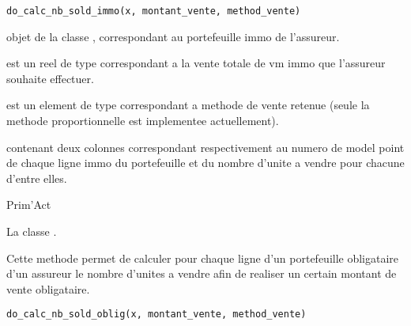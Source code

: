 \documentclass[a4paper]{book}
\begin{document}
%
\begin{Usage}
\begin{verbatim}
do_calc_nb_sold_immo(x, montant_vente, method_vente)
\end{verbatim}
\end{Usage}
%
\begin{Arguments}
\begin{ldescription}
\item[\code{x}] objet de la classe , correspondant au portefeuille immo de l'assureur.

\item[\code{montant\_vente}] est un reel de type  correspondant a la vente totale de vm immo
que l'assureur souhaite effectuer.

\item[\code{method\_vente}] est un element de type  correspondant a methode de vente retenue
(seule la methode proportionnelle est implementee actuellement).
\end{ldescription}
\end{Arguments}
%
\begin{Value}
 contenant deux colonnes  correspondant respectivement
au numero de model point de chaque ligne immo du portefeuille et du nombre d'unite a vendre pour chacune
d'entre elles.
\end{Value}
%
\begin{Author}\relax
Prim'Act
\end{Author}
%
\begin{SeeAlso}\relax
La classe .
\end{SeeAlso}
%
\begin{Description}\relax
Cette methode permet de calculer pour chaque ligne d'un portefeuille
obligataire d'un assureur le nombre d'unites a vendre afin de realiser un certain montant de vente obligataire.
\end{Description}
%
\begin{Usage}
\begin{verbatim}
do_calc_nb_sold_oblig(x, montant_vente, method_vente)
\end{verbatim}
\end{Usage}
%
\end{document}
